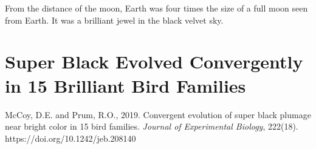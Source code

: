 \begin{savequote}[75mm]
From the distance of the moon, Earth was four times the size of a full moon seen from Earth. It was a brilliant jewel in the black velvet sky.
\end{savequote}

\chapter{Super Black Evolved Convergently in 15 Brilliant Bird Families}

\newthought{\textcolor{SchoolColor}{Reprinted from:}}
McCoy, D.E. and Prum, R.O., 2019. Convergent evolution of super black plumage near bright color in 15 bird families. \emph{Journal of Experimental Biology}, 222(18). 
\\
\newthought{\textcolor{SchoolColor}{Article and supplement available at:}} https://doi.org/10.1242/jeb.208140